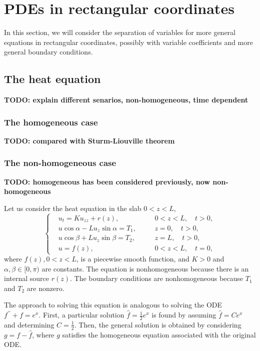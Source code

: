 \section{PDEs in rectangular coordinates}

In this section, we will consider the separation of variables for more general equations in rectangular coordinates, possibly with variable coefficients and more general boundary conditions. 

\subsection{The heat equation}

\textbf{TODO: explain different senarios, non-homogeneous, time dependent}

\subsubsection{The homogeneous case} \textbf{TODO: compared with Sturm-Liouville theorem}



\subsubsection{The non-homogeneous case} \textbf{TODO: homogeneous has been considered previously, now non-homogeneous}

Let us consider the heat equation in the slab $0<z<L$,
\begin{equation}\label{eq.heat_and_boundary'}
    \left\{\begin{aligned} 
        &u_t=K u_{z z} + r(z), && 0<z<L, \quad t>0, 
        \\ 
        &u \cos \alpha-L u_z \sin \alpha=T_1,\quad && z=0, \quad t>0, 
        \\ 
        &u \cos \beta+L u_z \sin \beta=T_2, && z=L, \quad t>0, 
        \\
        &u=f(z), && 0<z<L, \quad t=0,
    \end{aligned}\right.
\end{equation}
where $f(z), 0<z<L$, is a piecewise smooth function, and $K>0$ and $\alpha, \beta \in[0, \pi)$ are constants. The equation is nonhomogeneous because there is an internal source $r(z)$. The boundary conditions are nonhomogeneous because $T_1$ and $T_2$ are nonzero. 

The approach to solving this equation is analogous to solving the ODE $f^{\prime \prime}+f=e^x$. First, a particular solution $\hat{f}=\frac{1}{2} e^x$ is found by assuming $\hat{f}=C e^x$ and determining $C=\frac{1}{2}$. Then, the general solution is obtained by considering $g=f-\hat{f}$, where $g$ satisfies the homogeneous equation associated with the original ODE.

